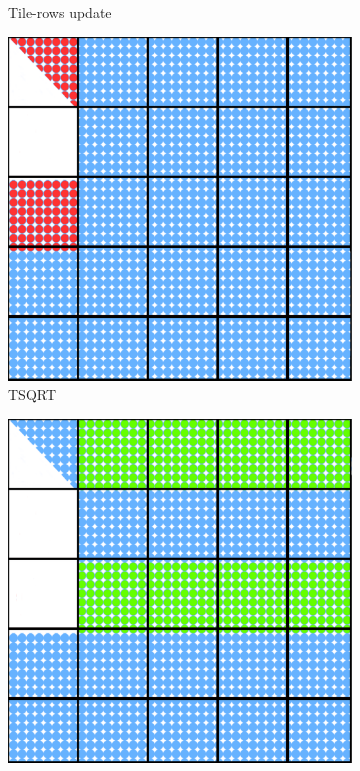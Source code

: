 \begin{figure}[h!]
\begin{subfigure}{0.2 \textwidth}
    \caption{\label{fig:tile_qr_update_2}Tile-rows update}
  \end{subfigure}
  \hfill
  \begin{subfigure}{0.2 \textwidth}
    \includegraphics[width=\textwidth]{fig/SVD_tile_5_grid}
    \caption{\label{fig:tile_qr_3}TSQRT}
  \end{subfigure}
  \hfill
  \begin{subfigure}{0.2 \textwidth}
    \includegraphics[width=\textwidth]{fig/SVD_tile_6_grid}

\end{subfigure}
\end{figure}
